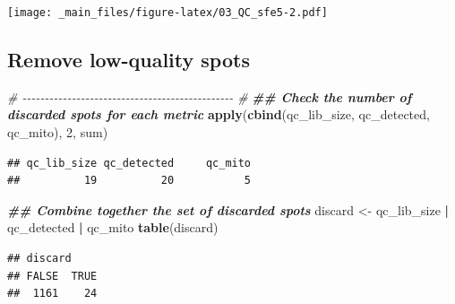 \documentclass[
]{book}
\newenvironment{Shaded}{\begin{snugshade}}{\end{snugshade}}
\newcommand{\CommentTok}[1]{\textcolor[rgb]{0.56,0.35,0.01}{\textit{#1}}}
\newcommand{\DecValTok}[1]{\textcolor[rgb]{0.00,0.00,0.81}{#1}}
\newcommand{\DocumentationTok}[1]{\textcolor[rgb]{0.56,0.35,0.01}{\textbf{\textit{#1}}}}
\newcommand{\FunctionTok}[1]{\textcolor[rgb]{0.13,0.29,0.53}{\textbf{#1}}}
\newcommand{\NormalTok}[1]{#1}
\newcommand{\OtherTok}[1]{\textcolor[rgb]{0.56,0.35,0.01}{#1}}
\newcommand{\SpecialCharTok}[1]{\textcolor[rgb]{0.81,0.36,0.00}{\textbf{#1}}}
\begin{document}
\texttt{[image: \_main\_files/figure-latex/03\_QC\_sfe5-2.pdf]}

\hypertarget{remove-low-quality-spots-1}{%
\subsection{Remove low-quality spots}\label{remove-low-quality-spots-1}}

\begin{Shaded}
\begin{Highlighting}[]
\CommentTok{\# {-}{-}{-}{-}{-}{-}{-}{-}{-}{-}{-}{-}{-}{-}{-}{-}{-}{-}{-}{-}{-}{-}{-}{-}{-}{-}{-}{-}{-}{-}{-}{-}{-}{-}{-}{-}{-}{-}{-}{-}{-}{-}{-}{-}{-}{-}{-} \#}
\DocumentationTok{\#\# Check the number of discarded spots for each metric}
\FunctionTok{apply}\NormalTok{(}\FunctionTok{cbind}\NormalTok{(qc\_lib\_size, qc\_detected, qc\_mito), }\DecValTok{2}\NormalTok{, sum)}
\end{Highlighting}
\end{Shaded}

\begin{verbatim}
## qc_lib_size qc_detected     qc_mito 
##          19          20           5
\end{verbatim}

\begin{Shaded}
\begin{Highlighting}[]
\DocumentationTok{\#\# Combine together the set of discarded spots}
\NormalTok{discard }\OtherTok{\textless{}{-}}\NormalTok{ qc\_lib\_size }\SpecialCharTok{|}\NormalTok{ qc\_detected }\SpecialCharTok{|}\NormalTok{ qc\_mito}
\FunctionTok{table}\NormalTok{(discard)}
\end{Highlighting}
\end{Shaded}

\begin{verbatim}
## discard
## FALSE  TRUE 
##  1161    24
\end{verbatim}
\end{document}
